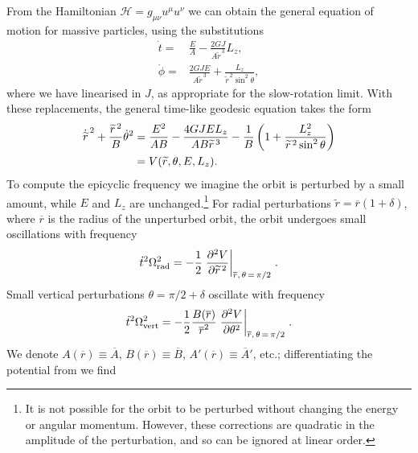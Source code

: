 From the Hamiltonian $\mathcal{H} = g_{\mu\nu}u^\mu u^\nu$ we can obtain the general equation of motion for massive particles, using the substitutions
\begin{align}
\dot{t} = {} & \frac{E}{A} -\frac{2GJ}{A\widetilde{r}^{\,3}}L_z, \\
\dot{\phi} = {} &  \frac{2GJE}{A\widetilde{r}^{\,3}} + \frac{L_z}{\widetilde{r}^{\,2} \sin^2\theta},
\end{align}
where we have linearised in $J$, as appropriate for the slow-rotation limit. With these replacements, the general time-like geodesic equation takes the form
\begin{align}
\dot{\widetilde{r}}^{\,2} + \frac{\widetilde{r}^{\,2}}{B} \dot{\theta}^2 = {} & \frac{E^2}{AB} -\frac{4GJEL_z}{AB \widetilde{r}^{\,3}}- \frac{1}{B}\left(1 + \frac{L_z^2}{\widetilde{r}^{\,2}\sin^2\theta}\right) \nonumber \\*
 = {} & V(\widetilde{r},\theta,E,L_z).
\label{eq:rdot}
\end{align}
To compute the epicyclic frequency we imagine the orbit is perturbed by a small amount, while $E$ and $L_z$ are unchanged.\footnote{It is not possible for the orbit to be perturbed without changing the energy or angular momentum. However, these corrections are quadratic in the amplitude of the perturbation, and so can be ignored at linear order.} For radial perturbations $\widetilde{r} = \overline{r}(1 + \delta)$, where $\overline{r}$ is the radius of the unperturbed orbit, the orbit undergoes small oscillations with frequency
\begin{equation}
\dot{t}^2\Omega_\mathrm{rad}^2 = -\frac{1}{2} \left. \frac{\partial {^2 V}}{\partial {\widetilde{r}^{\,2}}}\right|_{\overline{r},\,\theta\,=\,\pi/2\,}.
\end{equation}
Small vertical perturbations $\theta = \pi/2 + \delta$ oscillate with frequency
\begin{equation}
\dot{t}^2\Omega_\mathrm{vert}^2 = -\frac{1}{2} \frac{B(\overline{r})}{\overline{r}^2} \left. \frac{\partial {^2 V}}{\partial {\theta^2}}\right|_{\overline{r},\,\theta\,=\,\pi/2\,}.
\end{equation}
We denote $A(\overline{r}) \equiv \overline{A}$, $B(\overline{r}) \equiv \overline{B}$, $A'(\overline{r}) \equiv \overline{A}'$, etc.; differentiating the potential from  we find \citep{Berry2011}
